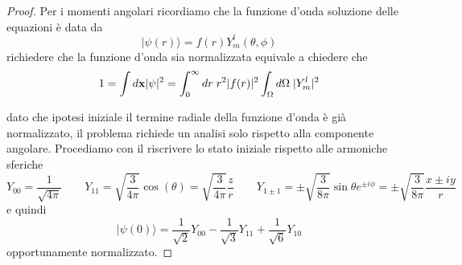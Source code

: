 \begin{proof}
Per i momenti angolari ricordiamo che la funzione d'onda soluzione delle equazioni \`e data da 
\begin{equation*}
	|\psi(r) \rangle = f(r)Y_{m}^l(\theta,\phi)
\end{equation*}	
richiedere che la funzione d'onda sia normalizzata equivale a chiedere che
\begin{equation*}
	1 = \int d\bold{x}|\psi|^2 = \int_{0}^{\infty}dr \; r^2|f(r)|^2 \int_{\Omega} d\Omega \; |Y_{m}^l|^2 
\end{equation*}
\newpage

dato che ipotesi iniziale il termine radiale della funzione d'onda \`e gi\`a normalizzato, il problema richiede un analisi solo rispetto alla componente angolare. Procediamo con il riscrivere lo stato iniziale rispetto alle armoniche sferiche
\begin{equation*}
	Y_{00} = \frac{1}{\sqrt{4\pi}} \quad \quad  Y_{11} = \sqrt{\frac{3}{4 \pi}} \cos(\theta) = \sqrt{\frac{3}{4 \pi}} \frac{z}{r} \quad \quad Y_{1 \pm 1} = \pm \sqrt{\frac{3}{8 \pi}} \sin \theta e^{\pm i \phi} = \pm \sqrt{\frac{3}{8\pi}} \frac{x \pm i y}{r}
\end{equation*}
e quindi 
\begin{equation*}
	|\psi(0) \rangle = \frac{1}{\sqrt{2}}Y_{00} - \frac{1}{\sqrt{3}}Y_{11} + \frac{1}{\sqrt{6}}Y_{10}
\end{equation*}
opportunamente normalizzato.


\end{proof}
